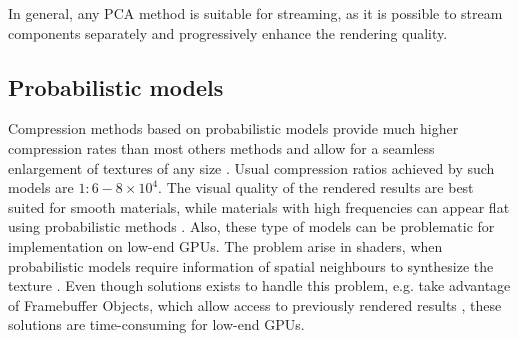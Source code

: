 In general, any PCA method is suitable for streaming, as it is possible to stream components separately and progressively enhance the rendering quality. 



 \subsection{Probabilistic models}
\label{section:prob_methods}

Compression methods based on probabilistic models \cite{car_model,gmrf_model,haindl}
 provide much higher compression rates than most others methods and allow for a seamless enlargement of textures of any size \cite{haindl}. 
Usual compression ratios achieved by such models are $1:6-8\times 10^{4}$.
The visual quality of the rendered results are best suited for smooth materials, while materials with high frequencies can appear flat using probabilistic methods \cite{haindl}.
Also, these type of models can be problematic for implementation on low-end GPUs. 
The problem arise in shaders, when probabilistic models require information of spatial neighbours to synthesize the texture \cite{gmrf_model,haindl}.
Even though solutions exists to handle this problem, e.g. take advantage of Framebuffer Objects, which allow access to previously rendered results \cite{haindl},
these solutions are time-consuming for low-end GPUs.





